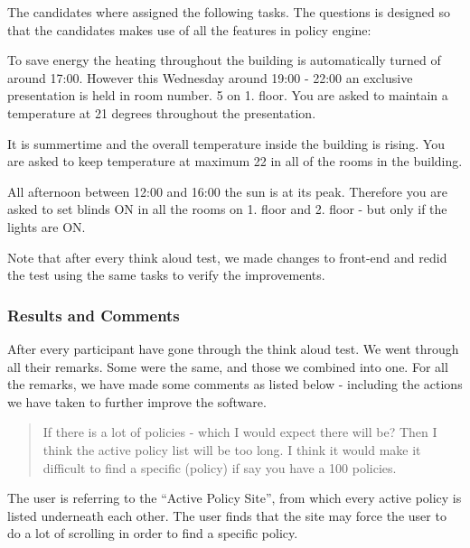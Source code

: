 The candidates where assigned the following tasks. The questions is designed so that the candidates makes use of all the features in policy engine:

\begin{framed}
To save energy the heating throughout the building is automatically turned of around 17:00. However this Wednesday around 19:00 - 22:00 an exclusive presentation is held in room number. 5 on 1. floor.
You are asked to maintain a temperature at 21 degrees throughout the presentation.

\end{framed}


\begin{framed}
It is summertime and the overall temperature inside the building is rising. You are asked to keep temperature at maximum 22 in all of the rooms in the  building.
\end{framed}


\begin{framed}
All afternoon between 12:00 and 16:00 the sun is at its peak. Therefore you are asked to set blinds ON in all the rooms on 1. floor and 2. floor - but only if the lights are ON.
\end{framed}

Note that after every think aloud test, we made changes to front-end and redid the test using the same tasks to verify the improvements. 



\subsubsection{Results and Comments}
\label{results-and-comments}
After every participant have gone through the think aloud test. We went through all their remarks. Some were the same, and those we combined into one.
For all the remarks, we have made some comments as listed below - including the actions we have taken to further improve the software.

\begin{quotation}
If there is a lot of policies - which I would expect there will be? Then I think the active policy list will be too long. I think it would make it difficult to find a specific (policy) if say you have a 100 policies.
\end{quotation}

The user is referring to the “Active Policy Site”, from which every active policy is listed underneath each other. The user finds that the site may force the user to do a lot of scrolling in order to find a specific policy.


